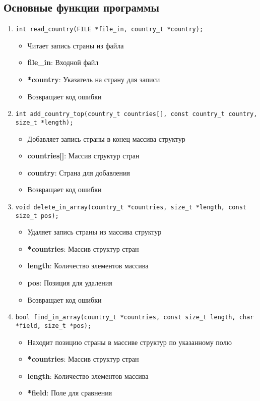 \subsection{Основные функции программы}
\begin{enumerate}
	\item \texttt{int read\_country(FILE *file\_in, country\_t *country);}
	\begin{itemize}
		\item Читает запись страны из файла
		\item \textbf{file\_in}: Входной файл
		\item \textbf{*country}: Указатель на страну для записи
		\item Возвращает код ошибки
	\end{itemize}
	\item \texttt{int add\_country\_top(country\_t countries[], const country\_t country, size\_t *length);}
	\begin{itemize}
		\item Добавляет запись страны в конец массива структур
		\item \textbf{countries[]}: Массив структур стран
		\item \textbf{country}: Страна для добавления
		\item Возвращает код ошибки
	\end{itemize}
	\item \texttt{void delete\_in\_array(country\_t *countries, size\_t *length, const size\_t pos);}
	\begin{itemize}
		\item Удаляет запись страны из массива структур
		\item \textbf{*countries}: Массив структур стран
		\item \textbf{length}: Количество элементов массива
		\item \textbf{pos}: Позиция для удаления
		\item Возвращает код ошибки
	\end{itemize}
	\item \texttt{bool find\_in\_array(country\_t *countries, const size\_t length, char *field, size\_t *pos);}
	\begin{itemize}
		\item Находит позицию страны в массиве структур по указанному полю
		\item \textbf{*countries}: Массив структур стран
		\item \textbf{length}: Количество элементов массива
		\item \textbf{*field}: Поле для сравнения

\end{itemize}
\end{enumerate}
